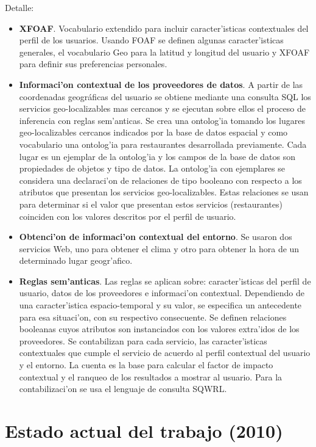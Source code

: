 \documentclass[11pt]{article}
\begin{document}
Detalle:
\begin{itemize}
\item \textbf{XFOAF}. Vocabulario extendido para incluir caracter'isticas contextuales del perfil de los usuarios. Usando FOAF se definen algunas caracter'isticas generales, el vocabulario Geo para la latitud y longitud del usuario y XFOAF para definir sus preferencias personales.
\item \textbf{Informaci'on contextual de los proveedores de datos}. A partir de las coordenadas geográficas del usuario se obtiene mediante una consulta SQL los servicios geo-localizables mas cercanos y se ejecutan sobre ellos el proceso de inferencia con reglas sem'anticas. Se crea una ontolog'ia tomando los lugares geo-localizables cercanos indicados por la base de datos espacial y como vocabulario una ontolog'ia para restaurantes desarrollada previamente. Cada lugar es un ejemplar de la ontolog'ia y los campos de la base de datos son propiedades de objetos y tipo de datos. La ontolog'ia con ejemplares se considera una declaraci'on de relaciones de tipo booleano con respecto a los atributos que presentan los servicios geo-localizables. Estas relaciones se usan para determinar si el valor que presentan estos servicios (restaurantes) coinciden con los valores descritos por el perfil de usuario.
\item \textbf{Obtenci'on de informaci'on contextual del entorno}. Se usaron dos servicios Web, uno para obtener el clima y otro para obtener la hora de un determinado lugar geogr'afico.
\item \textbf{Reglas sem'anticas}. Las reglas se aplican sobre: caracter'isticas del perfil de usuario, datos de los proveedores e informaci'on contextual. Dependiendo de una caracter'istica espacio-temporal y su valor, se especifica un antecedente para esa situaci'on, con su respectivo consecuente. Se definen relaciones booleanas cuyos atributos son instanciados con los valores extra'idos de los proveedores. Se contabilizan para cada servicio, las caracter'isticas contextuales que cumple el servicio de acuerdo al perfil contextual del usuario y el entorno. La cuenta es la base para calcular el factor de impacto contextual y el ranqueo de los resultados a mostrar al usuario. Para la contabilizaci'on se usa el lenguaje de consulta SQWRL.
\end{itemize}

\section{Estado actual del trabajo (2010)}
\end{document}
